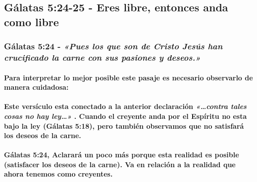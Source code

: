 \documentclass[11a pt,twoside]{article}
\newcommand{\scripture}[1]{%
  {\fontsize{12pt}{16pt}\selectfont\ScriptureFont\itshape #1}%
}
\let\oldsubsection\subsection
\renewcommand{\subsection}{\needspace{5\baselineskip}\oldsubsection}
\let\oldsubsubsection\subsubsection
\renewcommand{\subsubsection}{\needspace{4\baselineskip}\oldsubsubsection}
\let\oldparagraph\paragraph
\renewcommand{\paragraph}{\needspace{3\baselineskip}\oldparagraph}
\begin{document}
\subsection{Gálatas 5:24-25 - Eres libre, entonces anda como
libre}\label{guxe1latas-524-25---eres-libre-entonces-anda-como-libre}

\subsubsection{\texorpdfstring{Gálatas 5:24 -
\scripture{«Pues los que son de Cristo Jesús han crucificado la carne con sus pasiones y deseos.»}}{Gálatas 5:24 - }}\label{guxe1latas-524---pues-los-que-son-de-cristo-jesuxfas-han-crucificado-la-carne-con-sus-pasiones-y-deseos.}

\paragraph{Para interpretar lo mejor posible este pasaje es necesario
observarlo de manera
cuidadosa:}\label{para-interpretar-lo-mejor-posible-este-pasaje-es-necesario-observarlo-de-manera-cuidadosa}

\paragraph{\texorpdfstring{Este versículo esta conectado a la anterior
declaración \scripture{«…contra tales cosas no hay ley…»}. Cuando el
creyente anda por el Espíritu no esta bajo la ley (Gálatas 5:18), pero
también observamos que no satisfará los deseos de la
carne.}{Este versículo esta conectado a la anterior declaración . Cuando el creyente anda por el Espíritu no esta bajo la ley (Gálatas 5:18), pero también observamos que no satisfará los deseos de la carne.}}\label{este-versuxedculo-esta-conectado-a-la-anterior-declaraciuxf3n-contra-tales-cosas-no-hay-ley.-cuando-el-creyente-anda-por-el-espuxedritu-no-esta-bajo-la-ley-guxe1latas-518-pero-tambiuxe9n-observamos-que-no-satisfaruxe1-los-deseos-de-la-carne.}

\paragraph{Gálatas 5:24, Aclarará un poco más porque esta realidad es
posible (satisfacer los deseos de la carne). Va en relación a la
realidad que ahora tenemos como
creyentes.}\label{guxe1latas-524-aclararuxe1-un-poco-muxe1s-porque-esta-realidad-es-posible-satisfacer-los-deseos-de-la-carne.-va-en-relaciuxf3n-a-la-realidad-que-ahora-tenemos-como-creyentes.}
\end{document}
